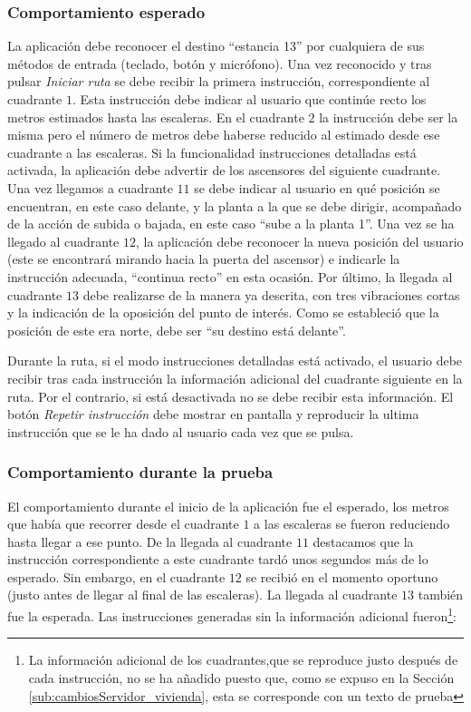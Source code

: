 \subsubsection*{Comportamiento esperado}

La aplicación debe reconocer el destino ``estancia 13'' por cualquiera de sus métodos de entrada (teclado, botón y micrófono). Una vez reconocido y tras pulsar \textit{Iniciar ruta} se debe recibir la primera instrucción, correspondiente al cuadrante $1$. Esta instrucción debe indicar al usuario que continúe recto los metros estimados hasta las escaleras. En el cuadrante $2$ la instrucción debe ser la misma pero el número de metros debe haberse reducido al estimado desde ese cuadrante a las escaleras. Si la funcionalidad instrucciones detalladas está activada, la aplicación debe advertir de los ascensores del siguiente cuadrante. Una vez llegamos a cuadrante $11$ se debe indicar al usuario en qué posición se encuentran, en este caso delante, y la planta a la que se debe dirigir, acompañado de la acción de subida o bajada, en este caso ``sube a la planta 1''. Una vez se ha llegado al cuadrante $12$, la aplicación debe reconocer la nueva posición del usuario (este se encontrará mirando hacia la puerta del ascensor) e indicarle la instrucción adecuada, ``continua recto'' en esta ocasión. Por último, la llegada al cuadrante $13$ debe realizarse de la manera ya descrita, con tres vibraciones cortas y la indicación de la oposición del punto de interés. Como se estableció que la posición de este era norte, debe ser ``su destino está delante''. 

Durante la ruta, si el modo instrucciones detalladas está activado, el usuario debe recibir tras cada instrucción la información adicional del cuadrante siguiente en la ruta. Por el contrario, si está desactivada no se debe recibir esta información. El botón \textit{Repetir instrucción} debe mostrar en pantalla y reproducir la ultima instrucción que se le ha dado al usuario cada vez que se pulsa. 


\subsubsection*{Comportamiento durante la prueba}

El comportamiento durante el inicio de la aplicación fue el esperado, los metros que había que recorrer desde el cuadrante $1$ a las escaleras se fueron reduciendo hasta llegar a ese punto. De la llegada al cuadrante $11$ destacamos que la instrucción correspondiente a este cuadrante tardó unos segundos más de lo esperado. Sin embargo, en el cuadrante $12$ se recibió en el momento oportuno (justo antes de llegar al final de las escaleras). La llegada al cuadrante $13$ también fue la esperada. Las instrucciones generadas sin la información adicional fueron\footnote{La información adicional de los cuadrantes,que se reproduce justo después de cada instrucción, no se ha añadido puesto que, como se expuso en la Sección \ref{sub:cambiosServidor_vivienda}, esta se corresponde con un texto de prueba}:

